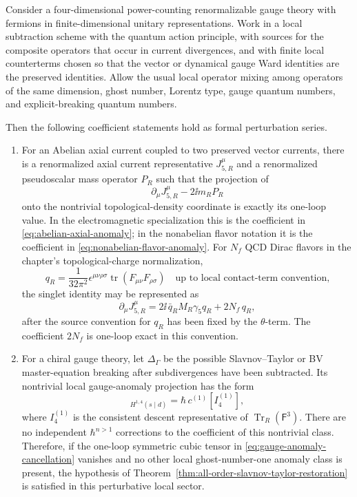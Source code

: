 \begin{quotedtheorem}
\label{thm:adler-bardeen-nonrenormalization}
Consider a four-dimensional power-counting renormalizable gauge theory with
fermions in finite-dimensional unitary representations.  Work in a local
subtraction scheme with the quantum action principle, with sources for the
composite operators that occur in current divergences, and with finite local
counterterms chosen so that the vector or dynamical gauge Ward identities are
the preserved identities.  Allow the usual local operator mixing among
operators of the same dimension, ghost number, Lorentz type, gauge quantum
numbers, and explicit-breaking quantum numbers.

Then the following coefficient statements hold as formal perturbation series.

\begin{enumerate}
\item For an Abelian axial current coupled to two preserved vector currents,
there is a renormalized axial current representative \(J_{5,R}^\mu\) and a
renormalized pseudoscalar mass operator \(P_R\) such that the projection of
\[
  \partial_\mu J_{5,R}^\mu-2\ii m_R P_R
\]
onto the nontrivial topological-density coordinate is exactly its one-loop
value.  In the electromagnetic specialization this is the coefficient in
\eqref{eq:abelian-axial-anomaly}; in the nonabelian flavor notation it is the
coefficient in \eqref{eq:nonabelian-flavor-anomaly}.  For \(N_f\) QCD Dirac
flavors in the chapter's topological-charge normalization,
\[
  q_R
  =
  \frac1{32\pi^2}
  \epsilon^{\mu\nu\rho\sigma}
  \operatorname{tr}(F_{\mu\nu}F_{\rho\sigma})
  \quad
  \text{up to local contact-term convention,}
\]
the singlet identity may be represented as
\begin{equation}
  \partial_\mu J_{5,R}^\mu
  =
  2\ii\,\bar q_R M_R\gamma_5 q_R
  +
  2N_f\,q_R ,
  \label{eq:adler-bardeen-qcd-singlet-identity}
\end{equation}
after the source convention for \(q_R\) has been fixed by the \(\theta\)-term.
The coefficient \(2N_f\) is one-loop exact in this convention.

\item For a chiral gauge theory, let \(\Delta_\Gamma\) be the possible
Slavnov--Taylor or BV master-equation breaking after subdivergences have been
subtracted.  Its nontrivial local gauge-anomaly projection has the form
\begin{equation}
  [\Delta_\Gamma]_{H^{1,4}(s\mid d)}
  =
  \hbar\,
  c^{(1)}[I_4^{(1)}],
  \label{eq:adler-bardeen-gauge-anomaly-class}
\end{equation}
where \(I_4^{(1)}\) is the consistent descent representative of
\(\operatorname{Tr}_R(\mathsf F^3)\).  There are no independent
\(\hbar^{n>1}\) corrections to the coefficient of this nontrivial class.
Therefore, if the one-loop symmetric cubic tensor in
\eqref{eq:gauge-anomaly-cancellation} vanishes and no other local
ghost-number-one anomaly class is present, the hypothesis of
Theorem~\ref{thm:all-order-slavnov-taylor-restoration} is satisfied in this
perturbative local sector.
\end{enumerate}


\end{quotedtheorem}
